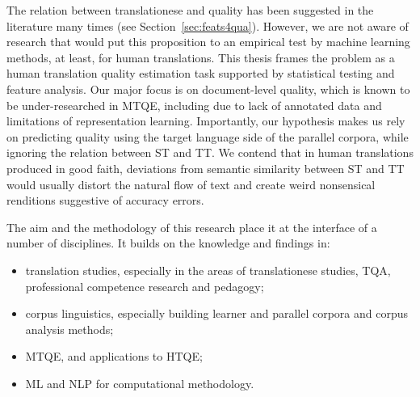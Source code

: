 The relation between translationese and quality has been suggested in the literature many times (see Section~\ref{sec:feats4qua}). However, we are not aware of research that would put this proposition to an empirical test by machine learning methods, at least, for human translations. This thesis frames the problem as a human translation quality estimation task supported by statistical testing and feature analysis. Our major focus is on document-level quality, which is known to be under-researched in MTQE, including due to lack of annotated data and limitations of representation learning. Importantly, our hypothesis makes us rely on predicting quality using the target language side of the parallel corpora, while ignoring the relation between ST and TT. We contend that in human translations produced in good faith, deviations from semantic similarity between ST and TT would usually distort the natural flow of text and create weird nonsensical renditions suggestive of accuracy errors. 

The aim and the methodology of this research place it at the interface of a number of disciplines. It builds on the knowledge and findings in: 
\begin{itemize}\compresslist{}
	\item translation studies, especially in the areas of translationese studies, \gls*{TQA}, professional competence research and pedagogy;
	\item corpus linguistics, especially building learner and parallel corpora and corpus analysis methods; 
	\item \gls*{MTQE}, and applications to HTQE;
	\item \gls*{ML} and \gls*{NLP} for computational methodology.
\end{itemize}

